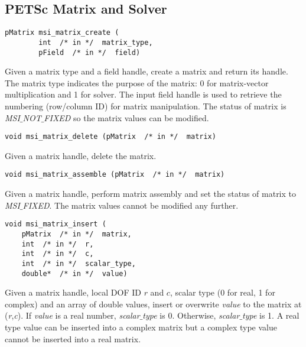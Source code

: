 \subsection{PETSc Matrix and Solver}

\begin{verbatim}
pMatrix msi_matrix_create (
        int  /* in */  matrix_type,
        pField  /* in */  field)
\end{verbatim}\vspace{-.5cm}\hspace{1cm}
Given a matrix type and a field handle, create a matrix and return its handle. The matrix type indicates the purpose of the matrix: 0 for matrix-vector multiplication and 1 for solver. The input field handle is used to retrieve the numbering (row/column ID) for matrix manipulation. The status of matrix is \textit{MSI$\_$NOT$\_$FIXED} so the matrix values can be modified.

\begin{verbatim}
void msi_matrix_delete (pMatrix  /* in */  matrix)
\end{verbatim}\vspace{-.5cm}\hspace{1cm}
Given a matrix handle, delete the matrix. 
	    
\begin{verbatim}
void msi_matrix_assemble (pMatrix  /* in */  matrix)
\end{verbatim}\vspace{-.5cm}\hspace{1cm}
Given a matrix handle, perform matrix assembly and set the status of matrix  to \textit{MSI$\_$FIXED}. 
The matrix values cannot be modified any further.

\begin{verbatim}
void msi_matrix_insert (
    pMatrix  /* in */  matrix, 
    int  /* in */  r, 
    int  /* in */  c, 
    int  /* in */  scalar_type,
    double*  /* in */  value)
\end{verbatim}\vspace{-.5cm}\hspace{1cm}
Given a matrix handle, local DOF ID $r$ and $c$, scalar type (0 for real, 1 for complex) and an array of double values, insert or overwrite \textit{value} to the matrix at (\textit{r},\textit{c}). If \textit{value} is a real number, \textit{scalar$\_$type} is 0. Otherwise, \textit{scalar$\_$type} is 1. A real type value can be inserted into a complex matrix but a complex type value cannot be inserted into a real matrix.   

